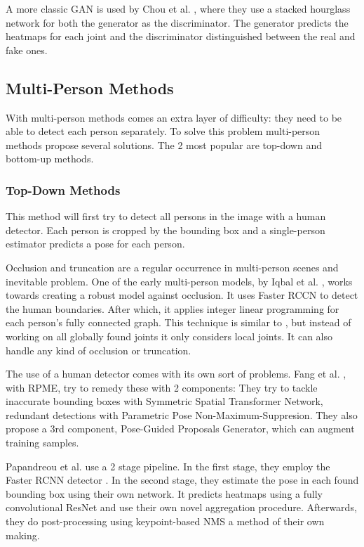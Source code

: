 A more classic \gls{GAN} is used by Chou et al. \cite{Chou2017}, where they use a stacked hourglass network for both the generator as the discriminator.
The generator predicts the heatmaps for each joint and the discriminator distinguished between the real and fake ones.

\subsection{Multi-Person Methods}
With multi-person methods comes an extra layer of difficulty: they need to be able to detect each person separately.
To solve this problem multi-person methods propose several solutions. 
The 2 most popular are top-down and bottom-up methods.

\subsubsection{Top-Down Methods}
This method will first try to detect all persons in the image with a human detector.
Each person is cropped by the bounding box and a single-person estimator predicts a pose for each person.

Occlusion and truncation are a regular occurrence in multi-person scenes and inevitable problem.
One of the early multi-person models, by Iqbal et al. \cite{Iqbal2016}, works towards creating a robust model against occlusion.
It uses Faster RCCN \cite{Ren2015} to detect the human boundaries.
After which, it applies integer linear programming for each person's fully connected graph.
This technique is similar to \cite{Pishchulin2015}, but instead of working on all globally found joints it only considers local joints.
It can also handle any kind of occlusion or truncation.

The use of a human detector comes with its own sort of problems.
Fang et al. \cite{Fang2016}, with \gls{RPME}, try to remedy these with 2 components:
They try to tackle inaccurate bounding boxes with Symmetric Spatial Transformer Network, redundant detections with Parametric Pose Non-Maximum-Suppresion.
They also propose a 3rd component, Pose-Guided Proposals Generator, which can augment training samples.

Papandreou et al. \cite{Papandreou2017} use a 2 stage pipeline.
In the first stage, they employ the Faster RCNN detector \cite{Ren2015}.
In the second stage, they estimate the pose in each found bounding box using their own network.
It predicts heatmaps using a fully convolutional \gls{ResNet} and use their own novel aggregation procedure.
Afterwards, they do post-processing using keypoint-based \gls{NMS} a method of their own making.

